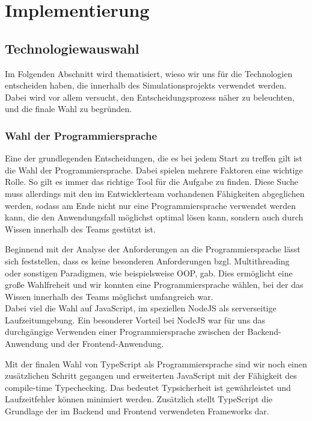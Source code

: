 \chapter{Implementierung}


\section{Technologiewauswahl}

Im Folgenden Abschnitt wird thematisiert, wieso wir uns für die Technologien entscheiden haben, die innerhalb des Simulationsprojekts verwendet werden. Dabei wird vor allem versucht, den Entscheidungsprozess näher zu beleuchten, und die finale Wahl zu begründen.

\subsection*{Wahl der Programmiersprache}
Eine der grundlegenden Entscheidungen, die es bei jedem Start zu treffen gilt ist die Wahl der Programmiersprache. Dabei spielen mehrere Faktoren eine wichtige Rolle. So gilt es immer das richtige Tool für die Aufgabe zu finden. Diese Suche muss allerdings mit den im Entwicklerteam vorhandenen Fähigkeiten abgeglichen werden, sodass am Ende nicht nur eine Programmiersprache verwendet werden kann, die den Anwendungsfall möglichst optimal lösen kann, sondern auch durch Wissen innerhalb des Teams gestützt ist.

Beginnend mit der Analyse der Anforderungen an die Programmiersprache lässt sich feststellen, dass es keine besonderen Anforderungen bzgl. Multithreading oder sonstigen Paradigmen, wie beispielsweise OOP, gab. Dies ermöglicht eine große Wahlfreheit und wir konnten eine Programmiersprache wählen, bei der das Wissen innerhalb des Teams möglichst umfangreich war.\\
Dabei viel die Wahl auf JavaScript, im speziellen NodeJS als serverseitige Laufzeitumgebung. Ein besonderer Vorteil bei NodeJS war für uns das durchgängige Verwenden einer Programmiersprache zwischen der Backend-Anwendung und der Frontend-Anwendung.

Mit der finalen Wahl von TypeScript als Programmiersprache sind wir noch einen zusätzlichen Schritt gegangen und erweiterten JavaScript mit der Fähigkeit des compile-time Typechecking. Das bedeutet Typsicherheit ist gewährleistet und Laufzeitfehler können minimiert werden. Zusätzlich stellt TypeScript die Grundlage der im Backend und Frontend verwendeten Frameworks dar.

